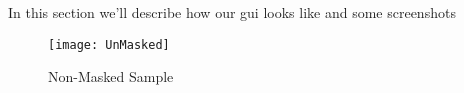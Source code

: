 In this section we'll describe how our gui looks like and some screenshots
\begin{figure}[H]
    \centering
    \texttt{[image: UnMasked]}
    \caption{Non-Masked Sample}
    \label{fig:UnMaskedSample}
\end{figure}
